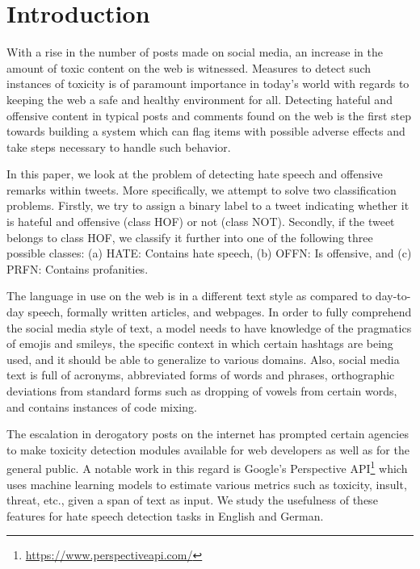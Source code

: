 \documentclass[
]{ceurart}
\begin{document}
\section{Introduction}
With a rise in the number of posts made on social media, an increase in the amount of toxic content on the web is witnessed. Measures to detect such instances of toxicity is of paramount importance in today's world with regards to keeping the web a safe and healthy environment for all. Detecting hateful and offensive content in typical posts and comments found on the web is the first step towards building a system which can flag items with possible adverse effects and take steps necessary to handle such behavior.

In this paper, we look at the problem of detecting hate speech and offensive remarks within tweets. More specifically, we attempt to solve two classification problems. Firstly, we try to assign a binary label to a tweet indicating whether it is hateful and offensive (class HOF) or not (class NOT). Secondly, if the tweet belongs to class HOF, we classify it further into one of the following three possible classes: (a) HATE: Contains hate speech, (b) OFFN: Is offensive, and (c) PRFN: Contains profanities.

The language in use on the web is in a different text style as compared to day-to-day speech, formally written articles, and webpages. In order to fully comprehend the social media style of text, a model needs to have knowledge of the pragmatics of emojis and smileys, the specific context in which certain hashtags are being used, and it should be able to generalize to various domains. Also, social media text is full of acronyms, abbreviated forms of words and phrases, orthographic deviations from standard forms such as dropping of vowels from certain words, and contains instances of code mixing.

The escalation in derogatory posts on the internet has prompted certain agencies to make toxicity detection modules available for web developers as well as for the general public. A notable work in this regard is Google's Perspective API\footnote{\url{https://www.perspectiveapi.com/}} which uses machine learning models to estimate various metrics such as toxicity, insult, threat, etc., given a span of text as input. We study the usefulness of these features for hate speech detection tasks in English and German.
\end{document}
